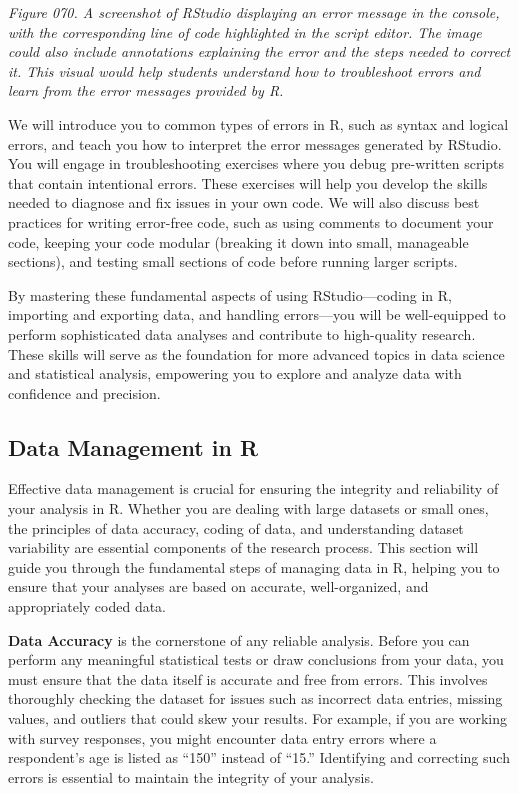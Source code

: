 \documentclass[
]{book}
\begin{document}
\emph{Figure 070. A screenshot of RStudio displaying an error message in the console, with the corresponding line of code highlighted in the script editor. The image could also include annotations explaining the error and the steps needed to correct it. This visual would help students understand how to troubleshoot errors and learn from the error messages provided by R.}

We will introduce you to common types of errors in R, such as syntax and logical errors, and teach you how to interpret the error messages generated by RStudio. You will engage in troubleshooting exercises where you debug pre-written scripts that contain intentional errors. These exercises will help you develop the skills needed to diagnose and fix issues in your own code. We will also discuss best practices for writing error-free code, such as using comments to document your code, keeping your code modular (breaking it down into small, manageable sections), and testing small sections of code before running larger scripts.

By mastering these fundamental aspects of using RStudio---coding in R, importing and exporting data, and handling errors---you will be well-equipped to perform sophisticated data analyses and contribute to high-quality research. These skills will serve as the foundation for more advanced topics in data science and statistical analysis, empowering you to explore and analyze data with confidence and precision.

\subsection{Data Management in R}\label{data-management-in-r}

Effective data management is crucial for ensuring the integrity and reliability of your analysis in R. Whether you are dealing with large datasets or small ones, the principles of data accuracy, coding of data, and understanding dataset variability are essential components of the research process. This section will guide you through the fundamental steps of managing data in R, helping you to ensure that your analyses are based on accurate, well-organized, and appropriately coded data.

\textbf{Data Accuracy} is the cornerstone of any reliable analysis. Before you can perform any meaningful statistical tests or draw conclusions from your data, you must ensure that the data itself is accurate and free from errors. This involves thoroughly checking the dataset for issues such as incorrect data entries, missing values, and outliers that could skew your results. For example, if you are working with survey responses, you might encounter data entry errors where a respondent's age is listed as ``150'' instead of ``15.'' Identifying and correcting such errors is essential to maintain the integrity of your analysis.
\end{document}

